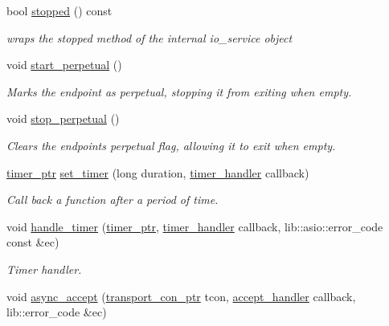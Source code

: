 \begin{DoxyCompactItemize}
bool \hyperlink{classwebsocketpp_1_1transport_1_1asio_1_1endpoint_a6633345d492730aa9f6d642ecc858ca3}{stopped} () const 
\begin{DoxyCompactList}\small\item\em wraps the stopped method of the internal io\+\_\+service object \end{DoxyCompactList}\item 
void \hyperlink{classwebsocketpp_1_1transport_1_1asio_1_1endpoint_a5a707078d482c141edf0a8cdd0bc6345}{start\+\_\+perpetual} ()
\begin{DoxyCompactList}\small\item\em Marks the endpoint as perpetual, stopping it from exiting when empty. \end{DoxyCompactList}\item 
void \hyperlink{classwebsocketpp_1_1transport_1_1asio_1_1endpoint_aaaf8c9ef3f41be6968674bd704dc23b0}{stop\+\_\+perpetual} ()
\begin{DoxyCompactList}\small\item\em Clears the endpoint\textquotesingle{}s perpetual flag, allowing it to exit when empty. \end{DoxyCompactList}\item 
\hyperlink{classwebsocketpp_1_1transport_1_1asio_1_1endpoint_a1802f5762009dbed117ff793fa87468f}{timer\+\_\+ptr} \hyperlink{classwebsocketpp_1_1transport_1_1asio_1_1endpoint_a63525bd209bb3dabf373b9b72d37e78e}{set\+\_\+timer} (long duration, \hyperlink{namespacewebsocketpp_1_1transport_a946cc56ff41139f3002149c15fd87bc9}{timer\+\_\+handler} callback)
\begin{DoxyCompactList}\small\item\em Call back a function after a period of time. \end{DoxyCompactList}\item 
void \hyperlink{classwebsocketpp_1_1transport_1_1asio_1_1endpoint_a5345d9bbde4333d7b4b4858a4816e596}{handle\+\_\+timer} (\hyperlink{classwebsocketpp_1_1transport_1_1asio_1_1endpoint_a1802f5762009dbed117ff793fa87468f}{timer\+\_\+ptr}, \hyperlink{namespacewebsocketpp_1_1transport_a946cc56ff41139f3002149c15fd87bc9}{timer\+\_\+handler} callback, lib\+::asio\+::error\+\_\+code const \&ec)
\begin{DoxyCompactList}\small\item\em Timer handler. \end{DoxyCompactList}\item 
void \hyperlink{classwebsocketpp_1_1transport_1_1asio_1_1endpoint_ae24b2ea11e8ce90b6101c1ab56d7fe48}{async\+\_\+accept} (\hyperlink{classwebsocketpp_1_1transport_1_1asio_1_1endpoint_ac5fc306f32d15f92dd1b22366eaba62d}{transport\+\_\+con\+\_\+ptr} tcon, \hyperlink{namespacewebsocketpp_1_1transport_a9326ea831379368ee47841b2e46cb009}{accept\+\_\+handler} callback, lib\+::error\+\_\+code \&ec)

\end{DoxyCompactItemize}
